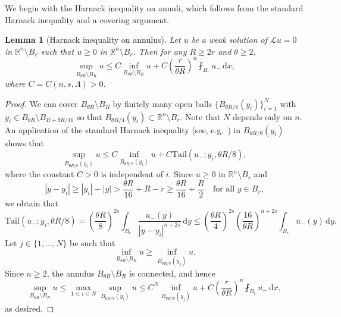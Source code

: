 \documentclass[11pt]{amsart}
\theoremstyle{plain}
\newtheorem{lemma}[theorem]{Lemma}
\theoremstyle{definition}
\numberwithin{equation}{section}
\begin{document}
We begin with the Harnack inequality on annuli, which follows from the standard Harnack inequality and a covering argument.


\begin{lemma}[Harnack inequality on annulus]\label{lem-harnack}
Let $u$ be a weak solution of $\mathcal{L}u=0$ in $\mathbb{R}^n \setminus B_r$ such that $u \geq 0$ in $\mathbb{R}^n \setminus B_r$. Then for any $R \geq 2r$ and $\theta \geq 2$,
    \begin{equation*}
        \sup_{B_{\theta R} \setminus B_{R}}u \leq C\inf_{B_{\theta R} \setminus B_{R}} u +C\left( \frac{r}{\theta R} \right)^n \fint_{B_r} u_- \,\mathrm{d}x,
    \end{equation*}
    where $C=C(n, s, \Lambda) >0$.    
\end{lemma}

\begin{proof}
    We can cover $B_{\theta R} \setminus B_{R}$ by finitely many open balls $\{B_{\theta R/8}(y_i)\}_{i=1}^N$ with $y_i \in B_{\theta R} \setminus B_{R+\theta R/16}$ so that $B_{\theta R/4}(y_i) \subset \mathbb{R}^n \setminus B_r$. Note that $N$ depends only on $n$. An application of the standard Harnack inequality (see, e.g.\ \cite[Theorem~1.1]{DCKP14}) in $B_{\theta R/8}(y_i)$ shows that
     \begin{equation*}
        \sup_{B_{\theta R/8}(y_i)} u \leq C\inf_{B_{\theta R/8}(y_i)}u +C\mathrm{Tail}(u_-; y_i, \theta R/8),
    \end{equation*}
    where the constant $C>0$ is independent of $i$. Since $u \geq 0$ in $\mathbb{R}^n \setminus B_r$ and 
    \begin{equation*}
        |y-y_i| \geq |y_i|-|y| > \frac{\theta R}{16}+ R-r \geq \frac{\theta R}{16}+\frac{R}{2} \quad \text{for all $y \in B_r$},
    \end{equation*}
    we obtain that
    \begin{equation*}
        \mathrm{Tail}(u_-; y_i, \theta R/8)=\left(\frac{\theta R}{8}\right)^{2s} \int_{B_r}\frac{u_-(y)}{|y-y_i|^{n+2s}}\,\mathrm{d}y \leq  \left(\frac{\theta R}{4}\right)^{2s}\left(\frac{16}{\theta R}\right)^{n+2s} \int_{B_r}u_-(y)\,\mathrm{d}y.
    \end{equation*}
Let $j \in \{1, \ldots, N\}$ be such that
    \begin{equation*}
       \inf_{B_{\theta R} \setminus B_{R}} u \geq \inf_{B_{\theta R/8}(y_j)}u.
    \end{equation*}
Since $n \geq 2$, the annulus $B_{\theta R} \setminus B_{R}$ is connected, and hence
    \begin{equation*}
        \sup_{B_{\theta R} \setminus B_{R}} u \leq \max_{1 \leq i \leq N} \sup_{B_{\theta R/8}(y_i)} u \leq C^N \inf_{B_{\theta R/8}(y_j)} u+C\left( \frac{r}{\theta R} \right)^n \fint_{B_r} u_- \,\mathrm{d}x,
    \end{equation*}
    as desired.
\end{proof}
\end{document}
